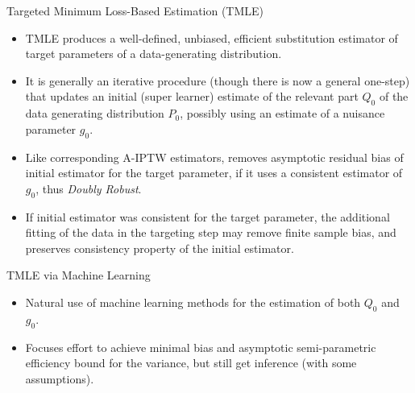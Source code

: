 \documentclass[12pt,t]{beamer}
\begin{document}
\begin{frame}[c]{Targeted Minimum Loss-Based Estimation (TMLE)}

\begin{center}
\begin{itemize}
  \item TMLE produces a well-defined, unbiased, efficient substitution estimator
    of target parameters of a data-generating distribution.
  \item It is generally an iterative procedure (though there is now a general
    one-step) that updates an initial (super learner) estimate  of the relevant
    part $Q_0$ of the data generating distribution $P_0$, possibly using an
    estimate of a nuisance parameter $g_0$.
  \item Like corresponding A-IPTW estimators, removes asymptotic residual bias
    of initial estimator for the target parameter, if it uses a consistent
    estimator of $g_0$, thus {\em Doubly Robust}.
  \item If initial estimator was consistent for the target parameter, the
    additional fitting of the data in the targeting step may remove finite
    sample bias, and  preserves consistency property of the initial estimator.
\end{itemize}
\end{center}


\end{frame}



\begin{frame}[c]{TMLE via Machine Learning}

\begin{center}
\begin{itemize}
  \item Natural use of machine learning methods for the estimation of both $Q_0$
    and $g_0$.
  \item Focuses effort to achieve minimal bias and asymptotic semi-parametric
    efficiency bound for the variance, but still get inference (with some
    assumptions).
\end{itemize}
\end{center}


\end{frame}
\end{document}
